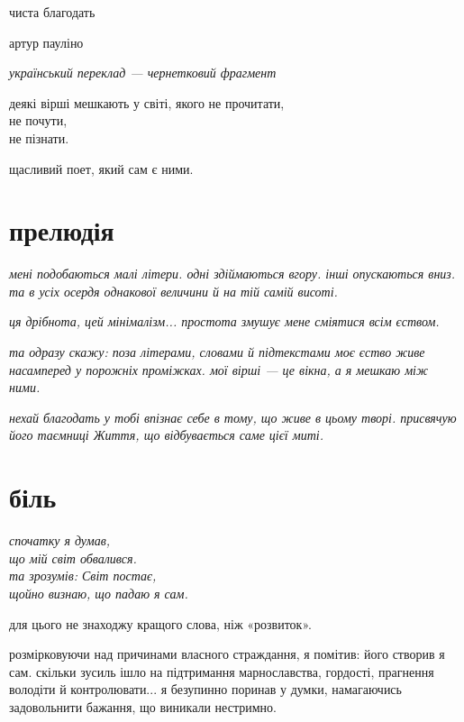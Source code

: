 \documentclass[oneside,12pt]{book}
\begin{document}
\vspace*{\fill}
\begin{center}
{\LARGE чиста благодать}

\vspace{1cm}
артур пауліно

\vspace{0.6cm}
\emph{український переклад — чернетковий фрагмент}
\end{center}
\vspace*{\fill}

\newpage
деякі вірші мешкають у світі, якого не прочитати,\\
не почути,\\
не пізнати.

щасливий поет, який сам є ними.

\newpage
\chapter*{прелюдія}

\emph{мені подобаються малі літери. одні здіймаються вгору. інші опускаються вниз. та в усіх осердя однакової величини й на тій самій висоті.}

\emph{ця дрібнота, цей мінімалізм... простота змушує мене сміятися всім єством.}

\emph{та одразу скажу: поза літерами, словами й підтекстами моє єство живе насамперед у порожніх проміжках. мої вірші --- це вікна, а я мешкаю між ними.}

\emph{нехай благодать у тобі впізнає себе в тому, що живе в цьому творі. присвячую його таємниці Життя, що відбувається саме цієї миті.}

\chapter*{біль}

\begin{flushright}
\emph{спочатку я думав,\\
що мій світ обвалився.\\
та зрозумів: Світ постає,\\
щойно визнаю, що падаю я сам.}
\end{flushright}

для цього не знаходжу кращого слова, ніж «розвиток».

розмірковуючи над причинами власного страждання, я помітив: його створив я сам. скільки зусиль ішло на підтримання марнославства, гордості, прагнення володіти й контролювати... я безупинно поринав у думки, намагаючись задовольнити бажання, що виникали нестримно.
\end{document}
